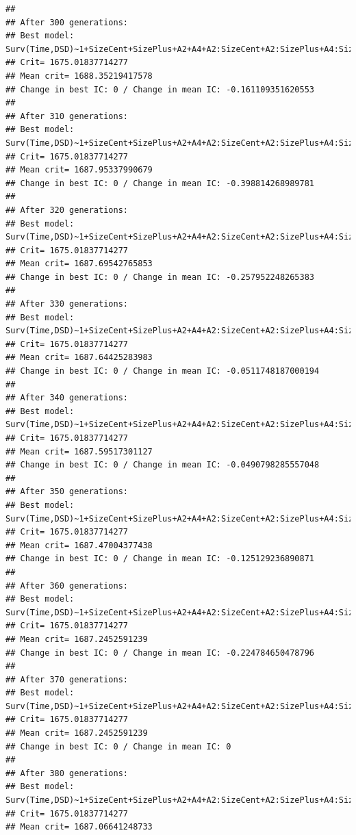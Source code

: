 \documentclass{article}\usepackage[]{graphicx}\usepackage[]{color}
\makeatletter
\newenvironment{kframe}{%
 \def\at@end@of@kframe{}%
 \ifinner\ifhmode%
  \def\at@end@of@kframe{\end{minipage}}%
  \begin{minipage}{\columnwidth}%
 \fi\fi%
 \def\FrameCommand##1{\hskip\@totalleftmargin \hskip-\fboxsep
 \colorbox{shadecolor}{##1}\hskip-\fboxsep
     \hskip-\linewidth \hskip-\@totalleftmargin \hskip\columnwidth}%
 \MakeFramed {\advance\hsize-\width
   \@totalleftmargin\z@ \linewidth\hsize
   \@setminipage}}%
 {\par\unskip\endMakeFramed%
 \at@end@of@kframe}
\newenvironment{knitrout}{}{} %
\makeatother
\begin{document}
\begin{knitrout}
\begin{kframe}
{\ttfamily\noindent\color{warningcolor}{\#\# Warning in fitter(X, Y, strats, offset, init, control, weights = weights, : Loglik converged before variable\ \ 4 ; beta may be infinite.}}

{\ttfamily\noindent\color{warningcolor}{\#\# Warning in fitter(X, Y, strats, offset, init, control, weights = weights, : Loglik converged before variable\ \ 11 ; beta may be infinite.}}\begin{verbatim}
## 
## After 300 generations:
## Best model: Surv(Time,DSD)~1+SizeCent+SizePlus+A2+A4+A2:SizeCent+A2:SizePlus+A4:SizePlus+A4:A2
## Crit= 1675.01837714277
## Mean crit= 1688.35219417578
## Change in best IC: 0 / Change in mean IC: -0.161109351620553
## 
## After 310 generations:
## Best model: Surv(Time,DSD)~1+SizeCent+SizePlus+A2+A4+A2:SizeCent+A2:SizePlus+A4:SizePlus+A4:A2
## Crit= 1675.01837714277
## Mean crit= 1687.95337990679
## Change in best IC: 0 / Change in mean IC: -0.398814268989781
## 
## After 320 generations:
## Best model: Surv(Time,DSD)~1+SizeCent+SizePlus+A2+A4+A2:SizeCent+A2:SizePlus+A4:SizePlus+A4:A2
## Crit= 1675.01837714277
## Mean crit= 1687.69542765853
## Change in best IC: 0 / Change in mean IC: -0.257952248265383
## 
## After 330 generations:
## Best model: Surv(Time,DSD)~1+SizeCent+SizePlus+A2+A4+A2:SizeCent+A2:SizePlus+A4:SizePlus+A4:A2
## Crit= 1675.01837714277
## Mean crit= 1687.64425283983
## Change in best IC: 0 / Change in mean IC: -0.0511748187000194
## 
## After 340 generations:
## Best model: Surv(Time,DSD)~1+SizeCent+SizePlus+A2+A4+A2:SizeCent+A2:SizePlus+A4:SizePlus+A4:A2
## Crit= 1675.01837714277
## Mean crit= 1687.59517301127
## Change in best IC: 0 / Change in mean IC: -0.0490798285557048
## 
## After 350 generations:
## Best model: Surv(Time,DSD)~1+SizeCent+SizePlus+A2+A4+A2:SizeCent+A2:SizePlus+A4:SizePlus+A4:A2
## Crit= 1675.01837714277
## Mean crit= 1687.47004377438
## Change in best IC: 0 / Change in mean IC: -0.125129236890871
## 
## After 360 generations:
## Best model: Surv(Time,DSD)~1+SizeCent+SizePlus+A2+A4+A2:SizeCent+A2:SizePlus+A4:SizePlus+A4:A2
## Crit= 1675.01837714277
## Mean crit= 1687.2452591239
## Change in best IC: 0 / Change in mean IC: -0.224784650478796
## 
## After 370 generations:
## Best model: Surv(Time,DSD)~1+SizeCent+SizePlus+A2+A4+A2:SizeCent+A2:SizePlus+A4:SizePlus+A4:A2
## Crit= 1675.01837714277
## Mean crit= 1687.2452591239
## Change in best IC: 0 / Change in mean IC: 0
## 
## After 380 generations:
## Best model: Surv(Time,DSD)~1+SizeCent+SizePlus+A2+A4+A2:SizeCent+A2:SizePlus+A4:SizePlus+A4:A2
## Crit= 1675.01837714277
## Mean crit= 1687.06641248733

\end{verbatim}
\end{kframe}
\end{knitrout}
\end{document}
